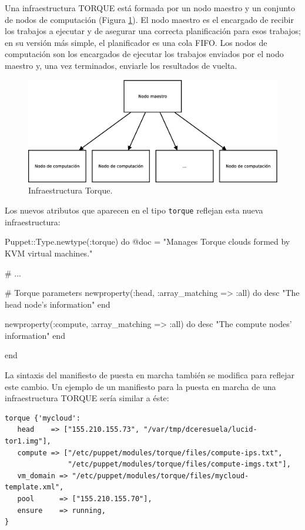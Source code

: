 Una infraestructura TORQUE está formada por un nodo maestro y un conjunto de nodos de computación (Figura \ref{figure:arquitectura-torque}). El nodo maestro es el encargado de recibir los trabajos a ejecutar y de asegurar una correcta planificación para esos trabajos; en su versión más simple, el planificador es una cola FIFO. Los nodos de computación son los encargados de ejecutar los trabajos enviados por el nodo maestro y, una vez terminados, enviarle los resultados de vuelta. \\

\begin{figure} [!htbp]
  \centering
  \includegraphics[width=13.5cm]{figuras/Arquitectura_Torque.eps}
  \caption{Infraestructura Torque.}
\label{figure:arquitectura-torque}
\end{figure}

\pagebreak

Los nuevos atributos que aparecen en el tipo \texttt{torque} reflejan esta nueva infraestructura:

\begin{rubycode}
Puppet::Type.newtype(:torque) do
   @doc = "Manages Torque clouds formed by KVM virtual machines."
   
   # ...

   # Torque parameters
   newproperty(:head, :array_matching => :all) do
      desc "The head node's information"
   end
   
   newproperty(:compute, :array_matching => :all) do
      desc "The compute nodes' information"
   end
   
end
\end{rubycode}

La sintaxis del manifiesto de puesta en marcha también se modifica para reflejar este cambio. Un ejemplo de un manifiesto para la puesta en marcha de una infraestructura TORQUE sería similar a éste:

\begin{lstlisting}
torque {'mycloud':
   head    => ["155.210.155.73", "/var/tmp/dceresuela/lucid-tor1.img"],
   compute => ["/etc/puppet/modules/torque/files/compute-ips.txt",
               "/etc/puppet/modules/torque/files/compute-imgs.txt"],
   vm_domain => "/etc/puppet/modules/torque/files/mycloud-template.xml",
   pool      => ["155.210.155.70"],
   ensure    => running,
}
\end{lstlisting}
